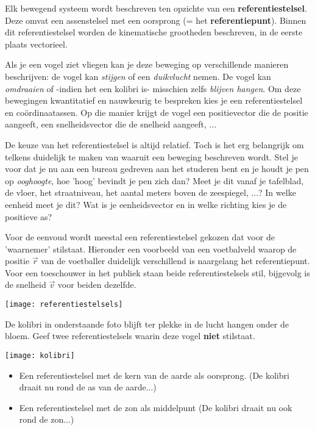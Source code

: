 \documentclass{ximera}
\begin{document}
	\author{Bart Lambregs}
    \xmsource\xmuitleg


Elk bewegend systeem wordt beschreven ten opzichte van een \textbf{referentiestelsel}. Deze omvat een assenstelsel met een oorsprong (= het \textbf{referentiepunt}).
Binnen dit referentiestelsel worden de kinematische grootheden beschreven, in de eerste plaats vectorieel. 
 
Als je een vogel ziet vliegen kan je deze beweging op verschillende manieren beschrijven: de vogel kan \textit{stijgen} of een \textit{duikvlucht} nemen. De vogel kan \textit{omdraaien} of -indien het een kolibri is- misschien zelfs \textit{blijven hangen}. Om deze bewegingen kwantitatief en nauwkeurig te bespreken kies je een referentiestelsel en coördinaatassen. Op die manier krijgt de vogel een positievector die de positie aangeeft, een snelheidsvector die de snelheid aangeeft, ... 

De keuze van het referentiestelsel is altijd relatief. Toch is het erg belangrijk om telkens duidelijk te maken van waaruit een beweging beschreven wordt.
Stel je voor dat je nu aan een bureau gedreven aan het studeren bent en je houdt je pen op \textit{ooghoogte}, hoe 'hoog' bevindt je pen zich dan? Meet je dit vanaf je tafelblad, de vloer, het straatniveau, het aantal meters boven de zeespiegel, ...? In welke eenheid meet je dit? Wat is je eenheidsvector en in welke richting kies je de positieve as? 

Voor de eenvoud wordt meestal een referentiestelsel gekozen dat voor de 'waarnemer' stilstaat. 
Hieronder een voorbeeld van een voetbalveld waarop de positie \(\vec{r}\) van de voetballer duidelijk verschillend is naargelang het referentiepunt.
Voor een toeschouwer in het publiek staan beide referentiestelsels stil, bijgevolg is de snelheid \(\vec{v}\) voor beiden dezelfde.


\begin{image}[0.5\textwidth]
	\texttt{[image: referentiestelsels]}
\end{image}

\begin{exercise}
De kolibri in onderstaande foto blijft ter plekke in de lucht hangen onder de bloem. Geef twee referentiestelsels waarin deze vogel \textbf{niet} stilstaat. 

\begin{image}[0.4\textwidth]
	\texttt{[image: kolibri]}
\end{image}

\begin{oplossing}
\begin{itemize}
\item Een referentiestelsel met de kern van de aarde als oorsprong. (De kolibri draait nu rond de as van de aarde...)
\item Een referentiestelsel met de zon als middelpunt (De kolibri draait nu ook rond de zon...)
\end{itemize}

\end{oplossing}

\end{exercise}
\end{document}
